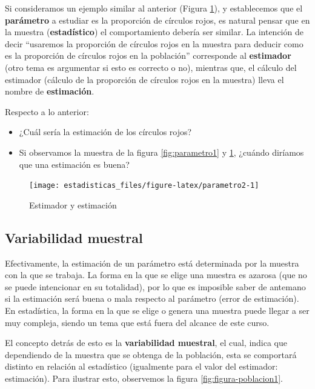\documentclass[
  11pt,
]{book}
\providecommand{\tightlist}{%
  \setlength{\itemsep}{0pt}\setlength{\parskip}{0pt}}
\theoremstyle{definition}
\theoremstyle{definition}
\theoremstyle{definition}
\theoremstyle{definition}
\theoremstyle{remark}
\begin{document}
Si consideramos un ejemplo similar al anterior (Figura \ref{fig:parametro2}), y establecemos que el \textbf{parámetro} a estudiar es la proporción de círculos rojos, es natural pensar que en la muestra (\textbf{estadístico}) el comportamiento debería ser similar. La intención de decir ``usaremos la proporción de círculos rojos en la muestra para deducir como es la proporción de círculos rojos en la población'' corresponde al \textbf{estimador} (otro tema es argumentar si esto es correcto o no), mientras que, el cálculo del estimador (cálculo de la proporción de círculos rojos en la muestra) lleva el nombre de \textbf{estimación}.

Respecto a lo anterior:

\begin{itemize}
\tightlist
\item
  ¿Cuál sería la estimación de los círculos rojos?
\item
  Si observamos la muestra de la figura \ref{fig:parametro1} y \ref{fig:parametro2}, ¿cuándo diríamos que una estimación es buena?
\end{itemize}

\begin{figure}

{\centering \texttt{[image: estadisticas\_files/figure-latex/parametro2-1]} 

}

\caption{Estimador y estimación}\label{fig:parametro2}
\end{figure}

\subsection{Variabilidad muestral}\label{variabilidad-muestral}

Efectivamente, la estimación de un parámetro está determinada por la muestra con la que se trabaja. La forma en la que se elige una muestra es azarosa (que no se puede intencionar en su totalidad), por lo que es imposible saber de antemano si la estimación será buena o mala respecto al parámetro (error de estimación). En estadística, la forma en la que se elige o genera una muestra puede llegar a ser muy compleja, siendo un tema que está fuera del alcance de este curso.

El concepto detrás de esto es la \textbf{variabilidad muestral}, el cual, indica que dependiendo de la muestra que se obtenga de la población, esta se comportará distinto en relación al estadístico (igualmente para el valor del estimador: estimación). Para ilustrar esto, observemos la figura \ref{fig:figura-poblacion1}.
\end{document}
